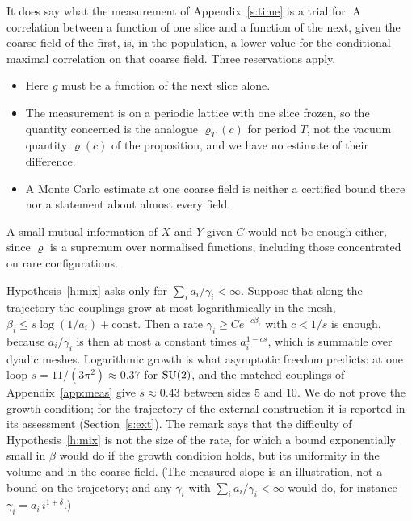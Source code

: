It does say what the measurement of Appendix~\ref{s:time} is a trial for. A correlation between a function
of one slice and a function of the next, given the coarse field of the first, is, in the population, a lower
value for the conditional maximal correlation on that coarse field. Three reservations apply.
\begin{itemize}
\item Here $g$ must be a function of the next slice alone.
\item The measurement is on a periodic lattice with one slice frozen, so the quantity concerned is the
analogue $\varrho_T(c)$ for period $T$, not the vacuum quantity $\varrho(c)$ of the proposition, and we have
no estimate of their difference.
\item A Monte Carlo estimate at one coarse field is neither a certified bound there nor a statement about
almost every field.
\end{itemize}
A small mutual information of $X$ and $Y$ given $C$ would not be enough either, since $\varrho$ is a
supremum over normalised functions, including those concentrated on rare configurations.

\begin{remark}\label{r:rate}
Hypothesis~\ref{h:mix} asks only for $\sum_ia_i/\gamma_i<\infty$. Suppose that along the trajectory the
couplings grow at most logarithmically in the mesh, $\beta_i\le s\log(1/a_i)+\text{const}$. Then a rate
$\gamma_i\ge Ce^{-c\beta_i}$ with $c<1/s$ is enough, because $a_i/\gamma_i$ is then at most a constant times
$a_i^{1-cs}$, which is summable over dyadic meshes. Logarithmic growth is what asymptotic freedom predicts:
at one loop $s=11/(3\pi^2)\approx0.37$ for $\mathrm{SU}(2)$, and the matched couplings of
Appendix~\ref{app:meas} give $s\approx0.43$ between sides $5$ and $10$. We do not prove the growth
condition; for the trajectory of the external construction it is reported in its assessment
(Section~\ref{s:ext}). The remark says that the difficulty of Hypothesis~\ref{h:mix} is not the size of the rate, for
which a bound exponentially small in $\beta$ would do if the growth condition holds, but its uniformity in
the volume and in the coarse field. (The measured slope is an illustration, not a bound on the trajectory;
and any $\gamma_i$ with $\sum_ia_i/\gamma_i<\infty$ would do, for instance $\gamma_i=a_i\,i^{1+\delta}$.)
\end{remark}


